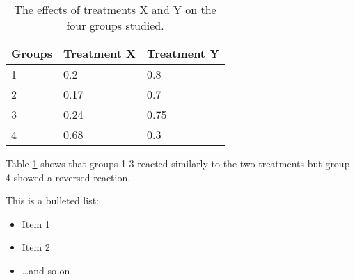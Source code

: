\documentclass[idxtotoc,hyperref,openany]{labbook} %
\begin{document}



\begin{table}[H]
\begin{tabular}{l l l}
\toprule
\textbf{Groups} & \textbf{Treatment X} & \textbf{Treatment Y} \\
\toprule
1 & 0.2 & 0.8\\
2 & 0.17 & 0.7\\
3 & 0.24 & 0.75\\
4 & 0.68 & 0.3\\
\bottomrule
\end{tabular}
\caption{The effects of treatments X and Y on the four groups studied.}
\label{tab:treatments_xy}
\end{table}

Table \ref{tab:treatments_xy} shows that groups 1-3 reacted similarly to the two treatments but group 4 showed a reversed reaction.




This is a bulleted list:

\begin{itemize}
\item Item 1
\item Item 2
\item \ldots and so on
\end{itemize}



\lipsum[6]



\lipsum[7]


\labday{} %
\end{document}
